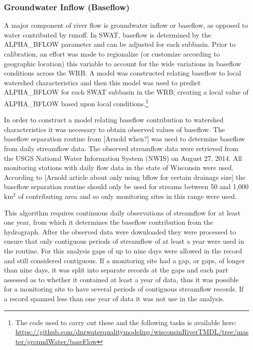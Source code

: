 \subsubsection{Groundwater Inflow (Baseflow)}
	A major component of river flow is groundwater inflow or baseflow, as opposed to water contributed by runoff. In SWAT, baseflow is determined by the ALPHA\_BFLOW parameter and can be adjusted for each subbasin. Prior to calibration, an effort was made to regionalize (or customize according to geographic location) this variable to account for the wide variations in baseflow conditions across the WRB. A model was constructed relating baseflow to local watershed characteristics and then this model was used to predict ALPHA\_BFLOW for each SWAT subbasin in the WRB; creating a local value of ALPHA\_BFLOW based upon local conditions.\footnote{The code used to carry out these and the following tasks is available here: \url{https://github.com/dnrwaterqualitymodeling/wisconsinRiverTMDL/tree/master/groundWater/baseFlow}}
	
	In order to construct a model relating baseflow contribution to watershed characteristics it was necessary to obtain observed values of baseflow. The baseflow separation routine from [Arnold when?] was used to determine baseflow from daily streamflow data. The observed streamflow data were retrieved from the USGS National Water Information System (NWIS) on August 27, 2014. All monitoring stations with daily flow data in the state of Wisconsin were used.  According to [Arnold article about only using bflow for certain drainage size] the baseflow separation routine should only be used for streams between 50 and 1,000 km$^2$ of contributing area and so only monitoring sites in this range were used. 
	
	This algorithm requires continuous daily observations of streamflow for at least one year, from which it determines the baseflow contribution from the hydrograph.	After the observed data were downloaded they were processed to ensure that only contiguous periods of streamflow of at least a year were used in the routine. For this analysis gaps of up to nine days were allowed in the record and still considered contiguous. If a monitoring site had a gap, or gaps, of longer than nine days, it was split into separate records at the gaps and each part assessed as to whether it contained at least a year of data, thus it was possible for a monitoring site to have several periods of contiguous streamflow records. If a record spanned less than one year of data it was not use in the analysis.
	
